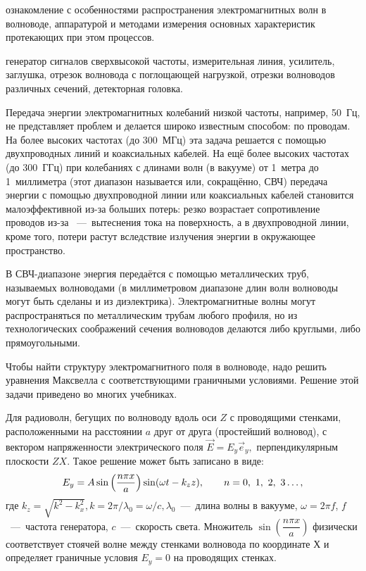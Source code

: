 
\begin{lab:aim} ознакомление с особенностями распространения
    электромагнитных волн в волноводе, аппаратурой и методами измерения основных
    характеристик протекающих при этом процессов. 
\end{lab:aim}

\begin{lab:equipment} генератор сигналов сверхвысокой частоты, измерительная
    линия, усилитель, заглушка, отрезок волновода с поглощающей нагрузкой, отрезки
    волноводов различных сечений, детекторная головка. 
\end{lab:equipment}

Передача энергии электромагнитных колебаний низкой частоты, например, 50~Гц, не
представляет проблем и делается широко известным способом: по проводам. На более
высоких частотах (до 300~МГц) эта задача решается с помощью двухпроводных линий
и коаксиальных кабелей. На ещё более высоких частотах (до 300~ГГц) при
колебаниях с длинами волн (в вакууме) от 1~метра до 1~миллиметра (этот диапазон
называется  или, сокращённо, СВЧ)
передача энергии с помощью двухпроводной линии или коаксиальных кабелей
становится малоэффективной из-за больших потерь: резко возрастает сопротивление
проводов из-за ~---~вытеснения тока на поверхность, а в
двухпроводной линии, кроме того, потери растут вследствие излучения энергии в
окружающее пространство.

В СВЧ-диапазоне энергия передаётся с помощью металлических труб, называемых
волноводами (в миллиметровом диапазоне длин волн волноводы могут быть сделаны и
из диэлектрика). Электромагнитные волны могут распространяться по металлическим
трубам любого профиля, но из технологических соображений сечения волноводов
делаются либо круглыми, либо прямоугольными.

Чтобы найти структуру электромагнитного поля в волноводе, надо решить уравнения
Максвелла с соответствующими граничными условиями. Решение этой задачи приведено
во многих учебниках.

Для радиоволн, бегущих по волноводу вдоль оси $Z$ с проводящими стенками,
расположенными на расстоянии $a$ друг от друга (простейший волновод), с вектором
напряженности электрического поля $\vec E=E_y \vec e_y,$ перпендикулярным
плоскости $ZX$. Такое решение может быть записано в виде: 
\begin{equation}
\eqmark{2.0.1} E_y=A\sin\left(\dfrac{n\pi x}{a}\right)\sin(\omega t-k_zz),
\qquad n=0,~1,~2,~3 \ldots, 
\end{equation} 
где $k_z=\sqrt{k^2-k^2_x},
k=2\pi/\lambda_0=\omega/c, \lambda_0$~---~длина волны в вакууме, $\omega=2\pi
f$, $f$~---~частота генератора, $c$~---~скорость света. Множитель
$\sin\left(\dfrac{n\pi x}{a}\right)$ физически соответствует стоячей волне между
стенками волновода по координате $Х$ и определяет граничные условия $E_y=0$ на
проводящих стенках.

